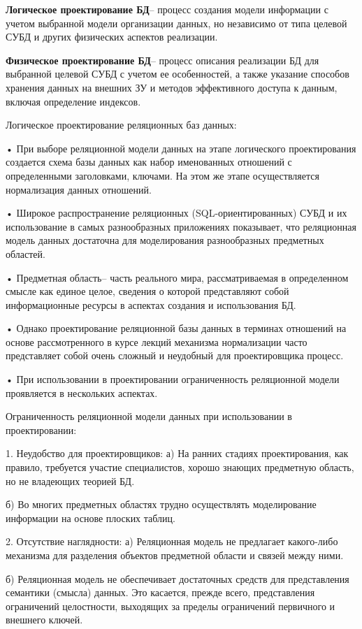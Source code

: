 \documentclass[a4paper,12pt]{article}
\begin{document}
\textbf{Логическое проектирование БД}– процесс создания 
модели информации с учетом выбранной модели 
организации данных, но независимо от типа целевой 
СУБД и других физических аспектов реализации.

\textbf{Физическое проектирование БД}– процесс описания 
реализации БД для выбранной целевой СУБД с 
учетом ее особенностей, а также указание способов 
хранения данных на внешних ЗУ и методов 
эффективного доступа к данным, включая 
определение индексов.

Логическое проектирование 
реляционных баз данных:

• При выборе реляционной модели данных на этапе логического 
проектирования создается схема базы данных как набор именованных 
отношений с определенными заголовками, ключами. На этом же этапе 
осуществляется нормализация данных отношений.

• Широкое распространение реляционных (SQL-ориентированных) СУБД и их 
использование в самых разнообразных приложениях показывает, что 
реляционная модель данных достаточна для моделирования разнообразных 
предметных областей.

• Предметная область– часть реального мира, рассматриваемая в 
определенном смысле как единое целое, сведения о которой представляют 
собой информационные ресурсы в аспектах создания и использования БД.

• Однако проектирование реляционной базы данных в терминах отношений на 
основе рассмотренного в курсе лекций механизма нормализации часто 
представляет собой очень сложный и неудобный для проектировщика 
процесс.

• При использовании в проектировании ограниченность реляционной модели 
проявляется в нескольких аспектах.

Ограниченность реляционной модели 
данных при использовании в проектировании:

1. Неудобство для проектировщиков:
   а) На ранних стадиях проектирования, как правило, требуется участие 
   специалистов, хорошо знающих предметную область, но не владеющих 
   теорией БД.
   
   б) Во многих предметных областях трудно осуществлять моделирование 
   информации на основе плоских таблиц.

2. Отсутствие наглядности:
   а) Реляционная модель не предлагает какого-либо механизма для разделения 
   объектов предметной области и связей между ними.
   
   б) Реляционная модель не обеспечивает достаточных средств для 
   представления семантики (смысла) данных. Это касается, прежде всего, 
   представления ограничений целостности, выходящих за пределы 
   ограничений первичного и внешнего ключей.
\end{document}
